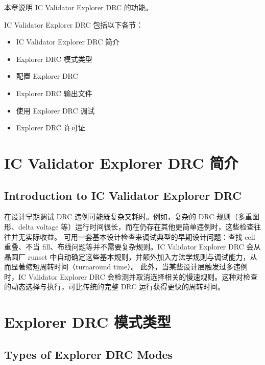 \label{chap:expdrc}

本章说明 IC Validator Explorer DRC 的功能。

IC Validator Explorer DRC 包括以下各节：
\begin{itemize}
  \item IC Validator Explorer DRC 简介
  \item Explorer DRC 模式类型
  \item 配置 Explorer DRC
  \item Explorer DRC 输出文件
  \item 使用 Explorer DRC 调试
  \item Explorer DRC 许可证
\end{itemize}

\section{IC Validator Explorer DRC 简介}
\subsection*{Introduction to IC Validator Explorer DRC}

在设计早期调试 DRC 违例可能既复杂又耗时。例如，复杂的 DRC 规则（多重图形、delta voltage 等）运行时间很长，而在仍存在其他更简单违例时，这些检查往往并无实际收益。
可用一套基本设计检查来调试典型的早期设计问题：查找 cell 重叠、不当 fill、布线问题等并不需要复杂规则。IC Validator Explorer DRC 会从晶圆厂 runset 中自动确定这些基本规则，并额外加入方法学规则与调试能力，从而显著缩短周转时间（turnaround time）。
此外，当某些设计层触发过多违例时，IC Validator Explorer DRC 会检测并取消选择相关的慢速规则。这种对检查的动态选择与执行，可比传统的完整 DRC 运行获得更快的周转时间。

\section{Explorer DRC 模式类型}
\subsection*{Types of Explorer DRC Modes}

